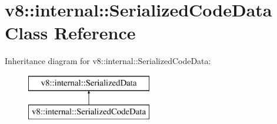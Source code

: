\hypertarget{classv8_1_1internal_1_1_serialized_code_data}{}\section{v8\+:\+:internal\+:\+:Serialized\+Code\+Data Class Reference}
\label{classv8_1_1internal_1_1_serialized_code_data}
Inheritance diagram for v8\+:\+:internal\+:\+:Serialized\+Code\+Data\+:\begin{figure}[H]
\begin{center}
\leavevmode
\includegraphics[height=2.000000cm]{classv8_1_1internal_1_1_serialized_code_data}
\end{center}
\end{figure}
